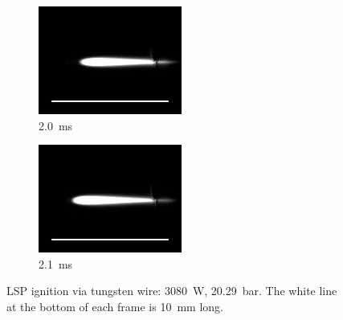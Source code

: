 \begin{figure}[h]
\begin{subfigure}[t]{0.3\textwidth}
        \includegraphics[width=\textwidth]{assets/5 results/ignitionFrames/20.jpg}
        \caption{\qty{2.0}{ms}}
        \label{fig:ignition_frames_20}
    \end{subfigure}
    \hfill
    \begin{subfigure}[t]{0.3\textwidth}
        \centering
        \includegraphics[width=\textwidth]{assets/5 results/ignitionFrames/21.jpg}
        \caption{\qty{2.1}{ms}}
        \label{fig:ignition_frames_21}
    \end{subfigure}
    \caption[LSP ignition via tungsten wire]{LSP ignition via tungsten wire: \qty{3080}{W}, \qty{20.29}{bar}. The white line at the bottom of each frame is \qty{10}{mm} long. }
    \label{fig:ignition_frames}
\end{figure}